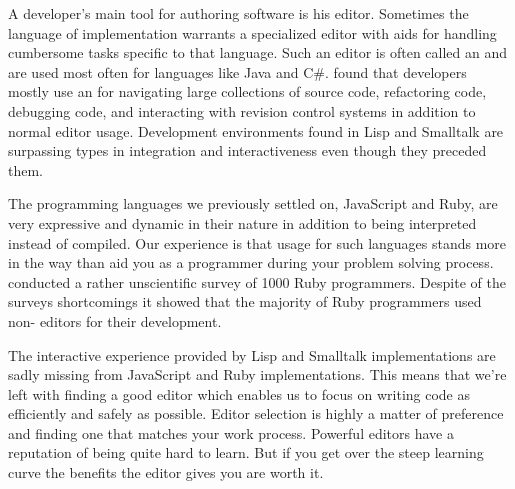 A developer's main tool for authoring software is his editor. Sometimes the
language of implementation warrants a specialized editor with aids for
handling cumbersome tasks specific to that language. Such an editor is often
called an %
and are used most often for languages like Java and C\#.
\citet{murphy06} found that developers mostly use an  for navigating
large collections of source code, refactoring code, debugging code, and
interacting with revision control systems in addition to normal editor usage.
Development environments found in Lisp%
and Smalltalk%
are surpassing  types in integration and interactiveness even though
they preceded them.

The programming languages we previously settled on, JavaScript and Ruby,
are very expressive and dynamic in their nature in addition to being
interpreted instead of compiled. Our experience is that  usage for
such languages stands more in the way than aid you as a programmer during
your problem solving process.
\citet{bray07} conducted a rather unscientific survey of 1000 Ruby
programmers. Despite of the surveys shortcomings it showed that
the majority of Ruby programmers used non- editors for their
development.

The interactive experience provided by Lisp and Smalltalk implementations are
sadly missing%
from JavaScript and Ruby implementations. This means that we're left with
finding a good editor which enables us to focus on writing code as efficiently
and safely as possible. Editor selection is highly a matter of preference and
finding one that matches your work process. Powerful editors have a
reputation of being quite hard to learn. But if you get over the steep
learning curve the benefits the editor gives you are worth it.

